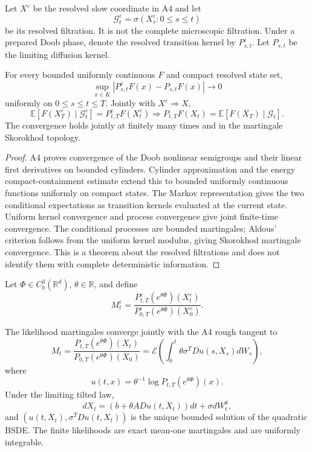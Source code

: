 Let \(X^\varepsilon\) be the resolved slow coordinate in A4 and let
\[
 \mathcal G_t^\varepsilon
 =\sigma(X_s^\varepsilon:0\le s\le t)
\]
be its resolved filtration.  It is not the complete microscopic filtration.
Under a prepared Doob phase, denote the resolved transition kernel by
\(P_{s,t}^\varepsilon\).  Let \(P_{s,t}\) be the limiting diffusion kernel.

\begin{lemma}
\label{lem:r4-c2-kernel}
For every bounded uniformly continuous \(F\) and compact resolved state set,
\[
 \sup_{x\in K}
 |P_{s,t}^\varepsilon F(x)-P_{s,t}F(x)|\to0
\]
uniformly on \(0\le s\le t\le T\).  Jointly with
\(X^\varepsilon\Rightarrow X\),
\[
 \mathbb E[F(X_T^\varepsilon)\mid\mathcal G_t^\varepsilon]
 =P_{t,T}^\varepsilon F(X_t^\varepsilon)
 \Rightarrow P_{t,T}F(X_t)
 =\mathbb E[F(X_T)\mid\mathcal G_t].
\]
The convergence holds jointly at finitely many times and in the martingale
Skorokhod topology.
\end{lemma}

\begin{proof}
A4 proves convergence of the Doob nonlinear semigroups and their linear first
derivatives on bounded cylinders.  Cylinder approximation and the energy
compact-containment estimate extend this to bounded uniformly continuous
functions uniformly on compact states.  The Markov representation gives the
two conditional expectations as transition kernels evaluated at the current
state.  Uniform kernel convergence and process convergence give joint
finite-time convergence.  The conditional processes are bounded martingales;
Aldous' criterion follows from the uniform kernel modulus, giving Skorokhod
martingale convergence.  This is a theorem about the resolved filtrations and
does not identify them with complete deterministic information.
\end{proof}

Let \(\Phi\in C_b^3(\mathbb R^d)\), \(\theta\in\mathbb R\), and define
\[
 M_t^\varepsilon
 =\frac{P_{t,T}^\varepsilon(e^{\theta\Phi})(X_t^\varepsilon)}
 {P_{0,T}^\varepsilon(e^{\theta\Phi})(X_0^\varepsilon)}.
\]

\begin{theorem}
\label{thm:r3-c2-girsanov}
The likelihood martingales converge jointly with the A4 rough tangent to
\[
 M_t=
 \frac{P_{t,T}(e^{\theta\Phi})(X_t)}
 {P_{0,T}(e^{\theta\Phi})(X_0)}
 =\mathcal E\left(
 \int_0^t\theta\sigma^TDu(s,X_s)dW_s
 \right),
\]
where
\[
 u(t,x)=\theta^{-1}\log P_{t,T}(e^{\theta\Phi})(x).
\]
Under the limiting tilted law,
\[
 dX_t=(b+\theta A Du(t,X_t))dt+\sigma dW_t^\theta,
\]
and \((u(t,X_t),\sigma^TDu(t,X_t))\) is the unique bounded solution of the
quadratic BSDE.  The finite likelihoods are exact mean-one martingales and are
uniformly integrable.
\end{theorem}

